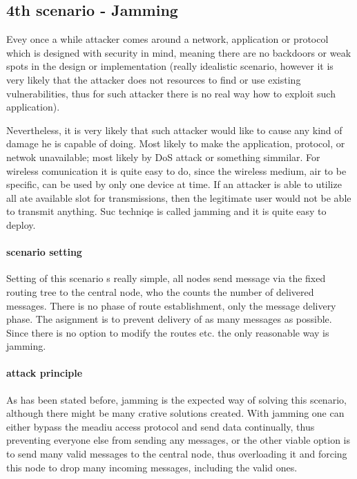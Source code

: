 \documentclass[
  digital, %
  table,   %
  nolof,     %
  nolot,     %
           oneside
]{fithesis3}
\begin{document}
    \subsection{4th scenario - Jamming}
    Evey once a while attacker comes around a network, application or protocol which is designed with security in mind, meaning there are no backdoors or weak spots in the design or implementation (really idealistic scenario, however it is very likely that the attacker does not resources to find or use existing vulnerabilities, thus for such attacker there is no real way how to exploit such application).

    Nevertheless, it is very likely that such attacker would like to cause any kind of damage he is capable of doing. Most likely to make the application, protocol, or netwok unavailable; most likely by DoS attack %
    or something simmilar. For wireless comunication it is quite easy to do, since the wireless medium, air to be specific, can be used by only one device at time. If an attacker is able to utilize all ate available slot for transmissions, then the legitimate user would not be able to transmit anything. Suc techniqe is called jamming and it is quite easy to deploy.

    \paragraph{scenario setting}
    Setting of this scenario s really simple, all nodes send message via the fixed routing tree to the central node, who the counts the number of delivered messages. There is no phase of route establishment, only the message delivery phase. The asignment is to prevent delivery of as many messages as possible. Since there is no option to modify the routes etc. the only reasonable way is jamming.

    \paragraph{attack principle}
    As has been stated before, jamming is the expected way of solving this scenario, although there might be many crative solutions created. With jamming one can either bypass the meadiu access protocol and send data continually, thus preventing everyone else from sending any messages, or the other viable option is to send many valid messages to the central node, thus overloading it and forcing this node to drop many incoming messages, including the valid ones.
\end{document}
